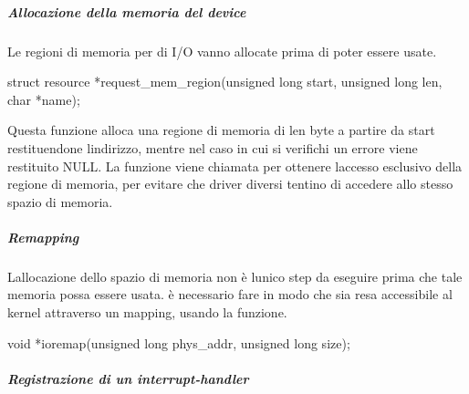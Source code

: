 \subparagraph*{Allocazione della memoria del device}

Le regioni di memoria per di I/O vanno allocate prima di poter essere usate. 
\begin{DoxyCode}
\textcolor{keyword}{struct }resource *request\_mem\_region(\textcolor{keywordtype}{unsigned} \textcolor{keywordtype}{long} start, \textcolor{keywordtype}{unsigned} \textcolor{keywordtype}{long} len, \textcolor{keywordtype}{char} *name);
\end{DoxyCode}
 Questa funzione alloca una regione di memoria di len byte a partire da start restituendone l\textquotesingle{}indirizzo, mentre nel caso in cui si verifichi un errore viene restituito N\+U\+LL. La funzione viene chiamata per ottenere l\textquotesingle{}accesso esclusivo della regione di memoria, per evitare che driver diversi tentino di accedere allo stesso spazio di memoria.

\subparagraph*{Remapping}

L\textquotesingle{}allocazione dello spazio di memoria non è l\textquotesingle{}unico step da eseguire prima che tale memoria possa essere usata. è necessario fare in modo che sia resa accessibile al kernel attraverso un mapping, usando la funzione. 
\begin{DoxyCode}
\textcolor{keywordtype}{void} *ioremap(\textcolor{keywordtype}{unsigned} \textcolor{keywordtype}{long} phys\_addr, \textcolor{keywordtype}{unsigned} \textcolor{keywordtype}{long} size);
\end{DoxyCode}


\subparagraph*{Registrazione di un interrupt-\/handler}

